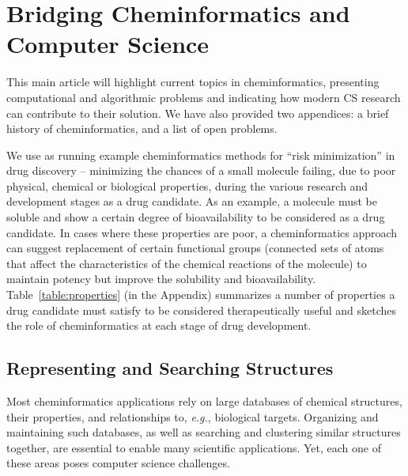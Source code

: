 \documentclass{sig-alternate}
\begin{document}
\section{Bridging Cheminformatics and Computer Science}

This main article will highlight current topics in
cheminformatics, presenting computational and algorithmic problems
and indicating how modern CS research can contribute to their
solution.  We have also provided two appendices: a brief history of
cheminformatics, and a list of open problems.

We use as running example cheminformatics methods for
``risk minimization'' in drug
discovery -- minimizing the chances
of a small molecule failing, due to poor physical, chemical or
biological properties, during the various research
and development stages
as a drug candidate. As an example, a molecule must be soluble
and show a certain degree of bioavailability to be considered as a
drug candidate. In cases where these properties are poor, a
cheminformatics approach can suggest replacement of certain functional
groups (connected
sets of atoms that affect the characteristics of the chemical
reactions of the molecule)
to maintain potency but improve the solubility and
bioavailability.  Table~\ref{table:properties} (in the Appendix)
summarizes a number of properties a drug candidate must satisfy to be
considered therapeutically useful
and sketches the role of cheminformatics at each
stage of drug development.
%
\subsection{Representing and Searching Structures}
\label{sec:databases}
%
Most cheminformatics applications rely on large databases of chemical
structures, their properties, and relationships to, \textit{e.g.},
biological targets.  Organizing and maintaining such databases, as
well as searching and clustering similar structures together, are
essential to enable many scientific applications. Yet, each one of
these areas poses computer science challenges.
\end{document}
